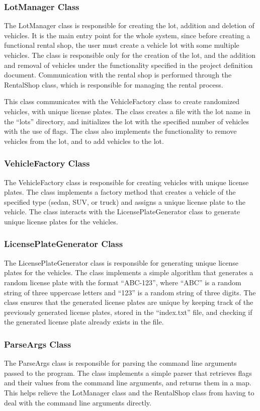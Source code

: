 \documentclass[conference]{IEEEtran}
\begin{document}
\subsubsection{LotManager Class}
The LotManager class is responsible for creating the lot, addition and deletion of vehicles. It is the main entry point for the whole system, since before creating a functional rental shop, the user must create a vehicle lot with some multiple vehicles. The class is responsible only for the creation of the lot, and the addition and removal of vehicles under the functionality specified in the project definition document. Communication with the rental shop is performed through the RentalShop class, which is responsible for managing the rental process. 

This class communicates with the VehicleFactory class to create randomized vehicles, with unique license plates. The class creates a file with the lot name in the ``lots'' directory, and initializes the lot with the specified number of vehicles with the use of flags. The class also implements the functionality to remove vehicles from the lot, and to add vehicles to the lot. 

\subsubsection{VehicleFactory Class}
The VehicleFactory class is responsible for creating vehicles with unique license plates. The class implements a factory method that creates a vehicle of the specified type (sedan, SUV, or truck) and assigns a unique license plate to the vehicle. The class interacts with the LicensePlateGenerator class to generate unique license plates for the vehicles. 

\subsubsection{LicensePlateGenerator Class}
The LicensePlateGenerator class is responsible for generating unique license plates for the vehicles. The class implements a simple algorithm that generates a random license plate with the format ``ABC-123'', where ``ABC'' is a random string of three uppercase letters and ``123'' is a random string of three digits. The class ensures that the generated license plates are unique by keeping track of the previously generated license plates, stored in the ``index.txt'' file, and checking if the generated license plate already exists in the file. 

\subsubsection{ParseArgs Class}
The ParseArgs class is responsible for parsing the command line arguments passed to the program. The class implements a simple parser that retrieves flags and their values from the command line arguments, and returns them in a map. This helps relieve the LotManager class and the RentalShop class from having to deal with the command line arguments directly. 
\end{document}
